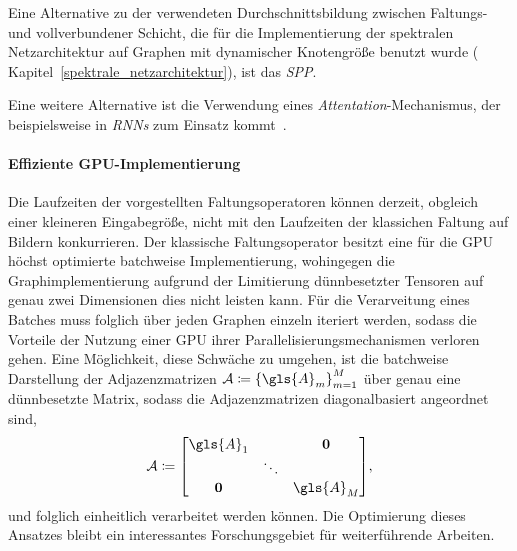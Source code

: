 Eine Alternative zu der verwendeten Durchschnittsbildung zwischen Faltungs- und vollverbundener Schicht, die für die Implementierung der spektralen Netzarchitektur auf Graphen mit dynamischer Knotengröße benutzt wurde (\vgl{} Kapitel~\ref{spektrale_netzarchitektur}), ist das \emph{\gls{SPP}}.

Eine weitere Alternative ist die Verwendung eines \emph{Attentation}-Mechanismus, der beispielsweise in \emph{\glspl{RNN}} zum Einsatz kommt~\cite{attentation}.

\paragraph{Effiziente GPU-Implementierung}
\label{gpu_implementierung}

Die Laufzeiten der vorgestellten Faltungsoperatoren können derzeit, obgleich einer kleineren Eingabegröße, nicht mit den Laufzeiten der klassichen Faltung auf Bildern konkurrieren.
Der klassische Faltungsoperator besitzt eine für die GPU höchst optimierte batchweise Implementierung, wohingegen die Graphimplementierung aufgrund der Limitierung dünnbesetzter Tensoren auf genau zwei Dimensionen dies nicht leisten kann.
Für die Verarveitung eines Batches muss folglich über jeden Graphen einzeln iteriert werden, sodass die Vorteile der Nutzung einer GPU \bzgl{} ihrer Parallelisierungsmechanismen verloren gehen.
Eine Möglichkeit, diese Schwäche zu umgehen, ist die batchweise Darstellung der Adjazenzmatrizen $\mathcal{A} \coloneqq {\left\{\gls{A}_m\right\}}_{m=1}^M$ über genau eine dünnbesetzte Matrix, sodass die Adjazenzmatrizen diagonalbasiert angeordnet sind, \dhe{}
\begin{equation*}
  \mathcal{A} \coloneqq \begin{bmatrix}
  \gls{A}_1 & & \ma{0}\\
  & \ddots & \\
  \ma{0} & & \gls{A}_M
  \end{bmatrix},
\end{equation*}
und folglich einheitlich verarbeitet werden können.
Die Optimierung dieses Ansatzes bleibt ein interessantes Forschungsgebiet für weiterführende Arbeiten.
